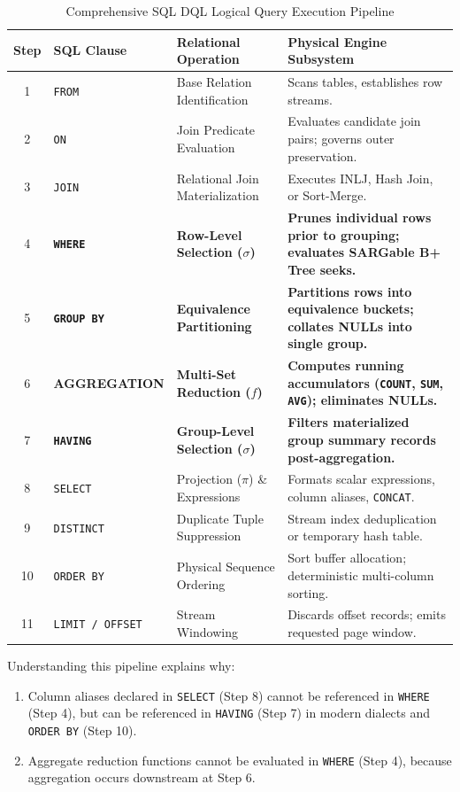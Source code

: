 \documentclass[10pt,twocolumn,letterpaper]{article}
\begin{document}
\begin{table}[htbp]
\caption{Comprehensive SQL DQL Logical Query Execution Pipeline}
\label{tab:execution_pipeline}
\centering
\scriptsize
\begin{tabular}{clll}
\toprule
\textbf{Step} & \textbf{SQL Clause} & \textbf{Relational Operation} & \textbf{Physical Engine Subsystem} \\
\midrule
1 & \texttt{FROM} & Base Relation Identification & Scans tables, establishes row streams. \\
2 & \texttt{ON} & Join Predicate Evaluation & Evaluates candidate join pairs; governs outer preservation. \\
3 & \texttt{JOIN} & Relational Join Materialization & Executes INLJ, Hash Join, or Sort-Merge. \\
4 & \textbf{\texttt{WHERE}} & \textbf{Row-Level Selection ($\sigma$)} & \textbf{Prunes individual rows prior to grouping; evaluates SARGable B+ Tree seeks.} \\
5 & \textbf{\texttt{GROUP BY}} & \textbf{Equivalence Partitioning} & \textbf{Partitions rows into equivalence buckets; collates NULLs into single group.} \\
6 & \textbf{AGGREGATION} & \textbf{Multi-Set Reduction ($f$)} & \textbf{Computes running accumulators (\texttt{COUNT}, \texttt{SUM}, \texttt{AVG}); eliminates NULLs.} \\
7 & \textbf{\texttt{HAVING}} & \textbf{Group-Level Selection ($\sigma$)} & \textbf{Filters materialized group summary records post-aggregation.} \\
8 & \texttt{SELECT} & Projection ($\pi$) \& Expressions & Formats scalar expressions, column aliases, \texttt{CONCAT}. \\
9 & \texttt{DISTINCT} & Duplicate Tuple Suppression & Stream index deduplication or temporary hash table. \\
10 & \texttt{ORDER BY} & Physical Sequence Ordering & Sort buffer allocation; deterministic multi-column sorting. \\
11 & \texttt{LIMIT / OFFSET} & Stream Windowing & Discards offset records; emits requested page window. \\
\bottomrule
\end{tabular}
\end{table}

Understanding this pipeline explains why:
\begin{enumerate}
    \item Column aliases declared in \texttt{SELECT} (Step 8) cannot be referenced in \texttt{WHERE} (Step 4), but can be referenced in \texttt{HAVING} (Step 7) in modern dialects and \texttt{ORDER BY} (Step 10).
    \item Aggregate reduction functions cannot be evaluated in \texttt{WHERE} (Step 4), because aggregation occurs downstream at Step 6.
\end{enumerate}
\end{document}
